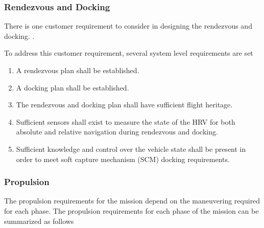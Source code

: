 \documentclass[paper=letter, fontsize=11pt]{scrartcl} %
\numberwithin{equation}{section} %
\numberwithin{figure}{section} %
\numberwithin{table}{section} %
\begin{document}
\subsubsection{Rendezvous and Docking}
There is one customer requirement to consider in designing the rendezvous and docking. .

To address this customer requirement, several system level requirements are set
\begin{enumerate}
    \item A rendezvous plan shall be established.
    \item A docking plan shall be established.
    \item The rendezvous and docking plan shall have sufficient flight heritage.
    \item Sufficient sensors shall exist to measure the state of the HRV for both absolute and relative navigation during rendezvous and docking.
    \item Sufficient knowledge and control over the vehicle state shall be present in order to meet soft capture mechanism (SCM) docking requirements.
\end{enumerate}


\subsubsection{Propulsion}
The propulsion requirements for the mission depend on the maneuvering required for each phase. The propulsion requirements for each phase of the mission can be summarized as follows
\end{document}
